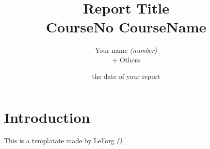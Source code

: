 \documentclass[12pt]{report}
\title{
  \Huge\bfseries{Report Title} \\
  \Large\bfseries{CourseNo CourseName}
}
\author{
  Your name \textit{(number)}  \\
  + Others
}
\date{the date of your report}
\begin{document}
\maketitle
\tableofcontents
\listoffigures

\chapter*{Introduction}

\large{
  This is a templatate made by LeForg \emph{(\cite{leforg})}
}



\normalsize


\newpage


\printbibliography

\appendix



\end{document}
